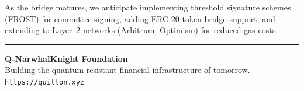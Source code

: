 \documentclass[11pt,a4paper]{article}
\begin{document}
As the bridge matures, we anticipate implementing threshold signature schemes (FROST) for committee signing, adding ERC-20 token bridge support, and extending to Layer~2 networks (Arbitrum, Optimism) for reduced gas costs.

\vspace{1cm}
\noindent\rule{\textwidth}{0.5pt}
\vspace{0.5cm}

\begin{center}
{\large\bfseries\color{qnkblue} Q-NarwhalKnight Foundation}\\[0.3cm]
{\normalsize Building the quantum-resistant financial infrastructure of tomorrow.}\\[0.3cm]
{\small\texttt{https://quillon.xyz}}
\end{center}
\end{document}
